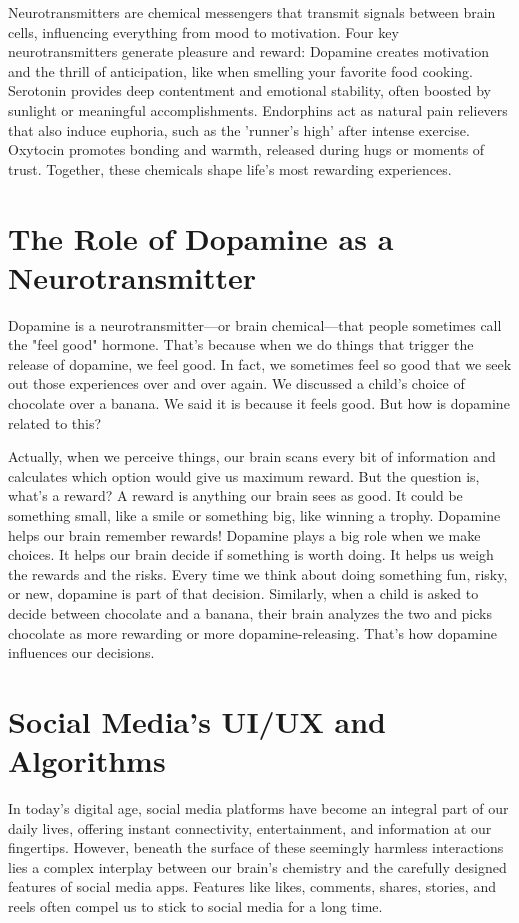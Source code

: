\documentclass[a4paper,10pt,twocolumn]{memoir}
\begin{document}
Neurotransmitters are chemical messengers that transmit signals between brain cells, influencing everything from mood to motivation. Four key neurotransmitters generate pleasure and reward: Dopamine creates motivation and the thrill of anticipation, like when smelling your favorite food cooking. Serotonin provides deep contentment and emotional stability, often boosted by sunlight or meaningful accomplishments. Endorphins act as natural pain relievers that also induce euphoria, such as the 'runner's high' after intense exercise. Oxytocin promotes bonding and warmth, released during hugs or moments of trust. Together, these chemicals shape life's most rewarding experiences.

\section*{The Role of Dopamine as a Neurotransmitter}

Dopamine is a neurotransmitter—or brain chemical—that people sometimes call the "feel good" hormone. That's because when we do things that trigger the release of dopamine, we feel good. In fact, we sometimes feel so good that we seek out those experiences over and over again. We discussed a child’s choice of chocolate over a banana. We said it is because it feels good. But how is dopamine related to this?

Actually, when we perceive things, our brain scans every bit of information and calculates which option would give us maximum reward. But the question is, what’s a reward? A reward is anything our brain sees as good. It could be something small, like a smile or something big, like winning a trophy. Dopamine helps our brain remember rewards! Dopamine plays a big role when we make choices. It helps our brain decide if something is worth doing. It helps us weigh the rewards and the risks. Every time we think about doing something fun, risky, or new, dopamine is part of that decision. Similarly, when a child is asked to decide between chocolate and a banana, their brain analyzes the two and picks chocolate as more rewarding or more dopamine-releasing. That’s how dopamine influences our decisions.

\section*{Social Media’s UI/UX and Algorithms}

In today’s digital age, social media platforms have become an integral part of our daily lives, offering instant connectivity, entertainment, and information at our fingertips. However, beneath the surface of these seemingly harmless interactions lies a complex interplay between our brain’s chemistry and the carefully designed features of social media apps. Features like likes, comments, shares, stories, and reels often compel us to stick to social media for a long time.
\end{document}
